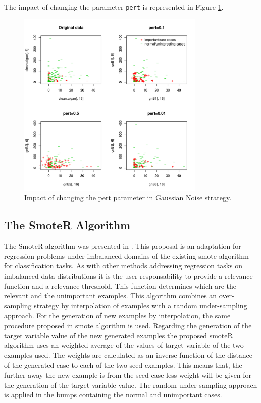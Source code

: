 \documentclass[10pt,a4paper]{article}\usepackage[]{graphicx}\usepackage[]{color}
\newenvironment{knitrout}{}{} %
\begin{document}
The impact of changing the parameter \texttt{pert} is represented in Figure \ref{fig:GN_plot3}.
\begin{knitrout}\footnotesize
{}\color{fgcolor}\begin{figure}

{\centering \includegraphics[width=0.8\textwidth]{figures/UBL-GN_plot3-1} 

}

\caption[Impact of changing the pert parameter in Gaussian Noise strategy]{Impact of changing the pert parameter in Gaussian Noise strategy.}\label{fig:GN_plot3}
\end{figure}


\end{knitrout}


\subsection{The SmoteR Algorithm}\label{sec:smoteR}

The SmoteR algorithm was presented in \cite{torgo2013smote}. This proposal is an adaptation for regression problems under imbalanced domains of the existing smote algorithm \cite{CBOK02} for classification tasks. As with other methods addressing regression tasks on imbalanced data distributions it is the user responsability to provide a relevance function and a relevance threshold. This function determines which are the relevant and the unimportant examples. This algorithm combines an over-sampling strategy by interpolation of examples with a random under-sampling approach. For the generation of new examples by interpolation, the same procedure proposed in smote algorithm is used. Regarding the generation of the target variable value of the new generated examples the proposed smoteR algorithm uses an weighted average of the values of target variable of the two examples used. The weights are calculated as an inverse function of the distance of the generated case to each of the two seed examples. This means that, the further away the new example is from the seed case less weight will be given for the generation of the target variable value. The random under-sampling approach is applied in the bumps containing the normal and unimportant cases. 
\end{document}

